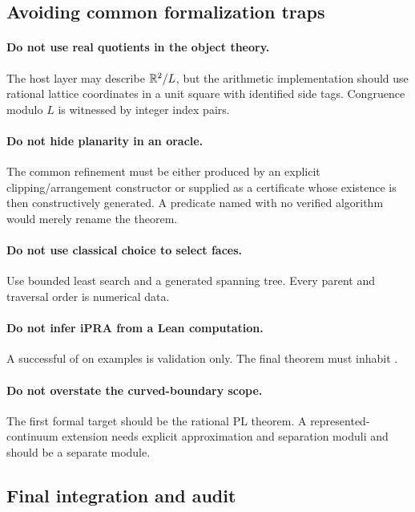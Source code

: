 \subsection{Avoiding common formalization traps}

\paragraph{Do not use real quotients in the object theory.}
The host layer may describe \(\mathbb R^2/L\), but the arithmetic implementation should use rational lattice coordinates in a unit square with identified side tags.  Congruence modulo \(L\) is witnessed by integer index pairs.

\paragraph{Do not hide planarity in an oracle.}
The common refinement must be either produced by an explicit clipping/arrangement constructor or supplied as a certificate whose existence is then constructively generated.  A predicate named  with no verified algorithm would merely rename the theorem.

\paragraph{Do not use classical choice to select faces.}
Use bounded least search and a generated spanning tree.  Every parent and traversal order is numerical data.

\paragraph{Do not infer iPRA from a Lean computation.}
A successful  of  on examples is validation only.  The final theorem must inhabit .

\paragraph{Do not overstate the curved-boundary scope.}
The first formal target should be the rational PL theorem.  A represented-continuum extension needs explicit approximation and separation moduli and should be a separate module.

\subsection{Final integration and audit}

